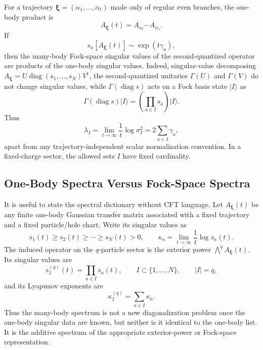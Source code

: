 \documentclass[aps,prb,onecolumn,nofootinbib,superscriptaddress]{revtex4-2}
\newcommand{\diag}{\operatorname{diag}}
\newcommand{\ket}[1]{\lvert #1\rangle}
\newcommand{\bxi}{{\boldsymbol{\xi}}}
\theoremstyle{plain}
\theoremstyle{definition}
\begin{document}
For a trajectory \(\bxi=(\alpha_1,\ldots,\alpha_t)\) made only of regular even
branches, the one-body product is
\begin{equation}
  A_\bxi(t)=A_{\alpha_t}\cdots A_{\alpha_1}.
  \label{eq:one-body-product}
\end{equation}
If
\begin{equation}
  s_a[A_\bxi(t)]\sim \exp\!\left(t\gamma_a\right),
  \label{eq:one-body-lyapunov}
\end{equation}
then the many-body Fock-space singular values of the second-quantized operator
are products of the one-body singular values.  Indeed, singular-value
decomposing \(A_\bxi=U\diag(s_1,\ldots,s_N)V^\dagger\), the second-quantized
unitaries \(\Gamma(U)\) and \(\Gamma(V)\) do not change singular values, while
\(\Gamma(\diag s)\) acts on a Fock basis state \(\ket{I}\) as
\begin{equation}
  \Gamma(\diag s)\ket{I}
  =
  \left(\prod_{a\in I}s_a\right)\ket{I}.
  \label{eq:fock-product-singular}
\end{equation}
Thus
\begin{equation}
  \lambda_I
  =
  \lim_{t\to\infty}\frac{1}{t}
  \log \sigma_I^2
  =
  2\sum_{a\in I}\gamma_a ,
  \label{eq:many-body-additive-lyapunov}
\end{equation}
apart from any trajectory-independent scalar normalization convention.  In a
fixed-charge sector, the allowed sets \(I\) have fixed cardinality.

\subsection{One-Body Spectra Versus Fock-Space Spectra}
\label{sec:one-body-many-body-spectra}

It is useful to state the spectral dictionary without CFT language.  Let
\(A_\bxi(t)\) be any finite one-body Gaussian transfer matrix associated with
a fixed trajectory and a fixed particle/hole chart.  Write its singular values
as
\begin{equation}
  s_1(t)\ge s_2(t)\ge\cdots\ge s_N(t)>0,
  \qquad
  \kappa_a=\lim_{t\to\infty}\frac{1}{t}\log s_a(t).
  \label{eq:one-body-kappa}
\end{equation}
The induced operator on the \(q\)-particle sector is the exterior power
\(\bigwedge^q A_\bxi(t)\).  Its singular values are
\begin{equation}
  s_I^{(q)}(t)
  =
  \prod_{a\in I}s_a(t),
  \qquad
  I\subset\{1,\ldots,N\},
  \qquad |I|=q,
  \label{eq:exterior-power-singular-values}
\end{equation}
and its Lyapunov exponents are
\begin{equation}
  \kappa_I^{(q)}
  =
  \sum_{a\in I}\kappa_a .
  \label{eq:exterior-power-exponents}
\end{equation}
Thus the many-body spectrum is not a new diagonalization problem once the
one-body singular data are known, but neither is it identical to the one-body
list.  It is the additive spectrum of the appropriate exterior-power or
Fock-space representation.
\end{document}
